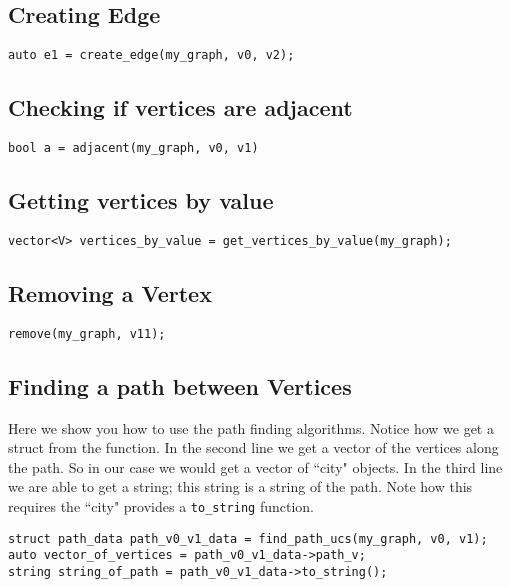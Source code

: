 \documentclass{article}
\begin{document}
\subsection{Creating Edge}
\begin{lstlisting}
auto e1 = create_edge(my_graph, v0, v2);
\end{lstlisting}

\subsection{Checking if vertices are adjacent}
\begin{lstlisting}
bool a = adjacent(my_graph, v0, v1)
\end{lstlisting}

\subsection{Getting vertices by value}
\begin{lstlisting}
vector<V> vertices_by_value = get_vertices_by_value(my_graph);
\end{lstlisting}

\subsection{Removing a Vertex}
\begin{lstlisting}
remove(my_graph, v11);
\end{lstlisting}

\subsection{Finding a path between Vertices}
Here we show you how to use the path finding algorithms. Notice how we get a struct from the function. In the second line we get a vector of the vertices along the path. So in our case we would get a vector of ``city" objects. In the third line we are able to get a string; this string is a string of the path. Note how this requires the ``city" provides a \texttt{to\_string} function.
\begin{lstlisting}
struct path_data path_v0_v1_data = find_path_ucs(my_graph, v0, v1);
auto vector_of_vertices = path_v0_v1_data->path_v;
string string_of_path = path_v0_v1_data->to_string();
\end{lstlisting}
\end{document}
